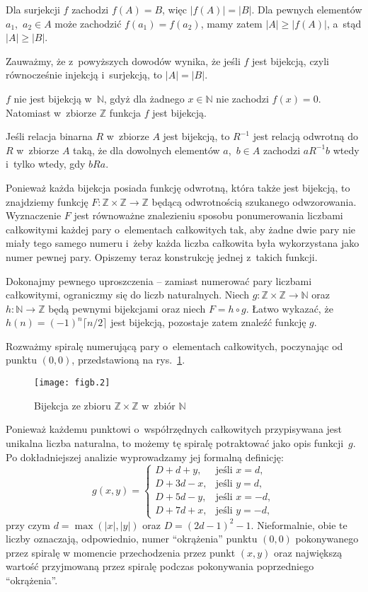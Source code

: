 \subexercise
Dla surjekcji $f$ zachodzi $f(A)=B$, więc $|f(A)|=|B|$. Dla pewnych elementów $a_1$,~$a_2\in A$ może zachodzić $f(a_1)=f(a_2)$, mamy zatem $|A|\ge|f(A)|$, a~stąd $|A|\ge|B|$.
\bigskip

Zauważmy, że z~powyższych dowodów wynika, że jeśli $f$ jest bijekcją, czyli równocześnie injekcją i~surjekcją, to $|A|=|B|$.

\exercise %
$f$ nie jest bijekcją w~$\mathbb{N}$, gdyż dla żadnego $x\in\mathbb{N}$ nie zachodzi $f(x)=0$. Natomiast w~zbiorze $\mathbb{Z}$ funkcja $f$ jest bijekcją.

\exercise %
Jeśli relacja binarna $R$ w~zbiorze $A$ jest bijekcją, to $R^{-1}$ jest relacją odwrotną do $R$ w~zbiorze $A$ taką, że dla dowolnych elementów $a$,~$b\in A$ zachodzi $aR^{-1}b$ wtedy i~tylko wtedy, gdy $bRa$.

\exercise %
Ponieważ każda bijekcja posiada funkcję odwrotną, która także jest bijekcją, to znajdziemy funkcję $F\colon\mathbb{Z}\times\mathbb{Z}\to\mathbb{Z}$ będącą odwrotnością szukanego odwzorowania. Wyznaczenie $F$ jest równoważne znalezieniu sposobu ponumerowania liczbami całkowitymi każdej pary o~elementach całkowitych tak, aby żadne dwie pary nie miały tego samego numeru i~żeby każda liczba całkowita była wykorzystana jako numer pewnej pary. Opiszemy teraz konstrukcję jednej z~takich funkcji.

Dokonajmy pewnego uproszczenia -- zamiast numerować pary liczbami całkowitymi, ograniczmy się do liczb naturalnych. Niech $g\colon\mathbb{Z}\times\mathbb{Z}\to\mathbb{N}$ oraz $h\colon\mathbb{N}\to\mathbb{Z}$ będą pewnymi bijekcjami oraz niech $F=h\circ g$. Łatwo wykazać, że $h(n)=(-1)^n\lceil n/2\rceil$ jest bijekcją, pozostaje zatem znaleźć funkcję $g$.

Rozważmy spiralę numerującą pary o~elementach całkowitych, poczynając od punktu $(0,0)$, przedstawioną na rys.~\ref{fig:B.3-4}.
\begin{figure}[ht]
	\begin{center}
		\texttt{[image: figb.2]}
	\end{center}
	\caption{Bijekcja ze zbioru $\mathbb{Z}\times\mathbb{Z}$ w~zbiór $\mathbb{N}$} \label{fig:B.3-4}
\end{figure}
Ponieważ każdemu punktowi o~współrzędnych całkowitych przypisywana jest unikalna liczba naturalna, to możemy tę spiralę potraktować jako opis funkcji~$g$. Po dokładniejszej analizie wyprowadzamy jej formalną definicję:
\[
	g(x,y) =
	\begin{cases}
		D+d+y, & \text{jeśli $x=d$}, \\
		D+3d-x, & \text{jeśli $y=d$}, \\
		D+5d-y, & \text{jeśli $x=-d$}, \\
		D+7d+x, & \text{jeśli $y=-d$},
	\end{cases}
\]
przy czym $d=\max(|x|,|y|)$ oraz $D=(2d-1)^2-1$. Nieformalnie, obie te liczby oznaczają, odpowiednio, numer ``okrążenia'' punktu $(0,0)$ pokonywanego przez spiralę w momencie przechodzenia przez punkt $(x,y)$ oraz największą wartość przyjmowaną przez spiralę podczas pokonywania poprzedniego ``okrążenia''.

